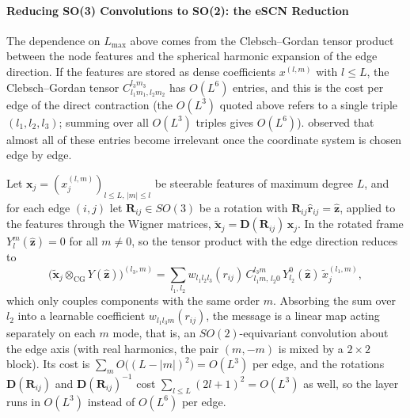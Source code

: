 \paragraph{Reducing SO(3) Convolutions to SO(2): the eSCN Reduction}

The dependence on $L_{\max}$ above comes from the Clebsch--Gordan tensor product between the node features and the spherical harmonic expansion of the edge direction. If the features are stored as dense coefficients $x^{(l,m)}$ with $l \le L$, the Clebsch--Gordan tensor $C^{l_3 m_3}_{l_1 m_1, l_2 m_2}$ has $O(L^6)$ entries, and this is the cost per edge of the direct contraction (the $O(L^3)$ quoted above refers to a single triple $(l_1, l_2, l_3)$; summing over all $O(L^3)$ triples gives $O(L^6)$). \citet{passaro2023escn} observed that almost all of these entries become irrelevant once the coordinate system is chosen edge by edge.

\begin{proposition}\label{prop:escn_reduccion}
Let $\mathbf{x}_j = (x_j^{(l,m)})_{l \le L,\, |m| \le l}$ be steerable features of maximum degree $L$, and for each edge $(i,j)$ let $\mathbf{R}_{ij} \in SO(3)$ be a rotation with $\mathbf{R}_{ij}\hat{\mathbf{r}}_{ij} = \hat{\mathbf{z}}$, applied to the features through the Wigner matrices, $\tilde{\mathbf{x}}_j = \mathbf{D}(\mathbf{R}_{ij})\,\mathbf{x}_j$. In the rotated frame $Y_l^m(\hat{\mathbf{z}}) = 0$ for all $m \neq 0$, so the tensor product with the edge direction reduces to
\[\Big(\tilde{\mathbf{x}}_j \otimes_{\text{CG}} Y(\hat{\mathbf{z}})\Big)^{(l_3, m)} = \sum_{l_1, l_2} w_{l_1 l_2 l_3}(r_{ij})\, C^{l_3 m}_{l_1 m,\, l_2 0}\, Y_{l_2}^{0}(\hat{\mathbf{z}})\, \tilde{x}_j^{(l_1, m)},\]
which only couples components with the same order $m$. Absorbing the sum over $l_2$ into a learnable coefficient $w_{l_1 l_3 m}(r_{ij})$, the message is a linear map acting separately on each $m$ mode, that is, an $SO(2)$-equivariant convolution about the edge axis (with real harmonics, the pair $(m, -m)$ is mixed by a $2 \times 2$ block). Its cost is $\sum_{m} O\big((L - |m|)^2\big) = O(L^3)$ per edge, and the rotations $\mathbf{D}(\mathbf{R}_{ij})$ and $\mathbf{D}(\mathbf{R}_{ij})^{-1}$ cost $\sum_{l \le L} (2l+1)^2 = O(L^3)$ as well, so the layer runs in $O(L^3)$ instead of $O(L^6)$ per edge.
\end{proposition}

